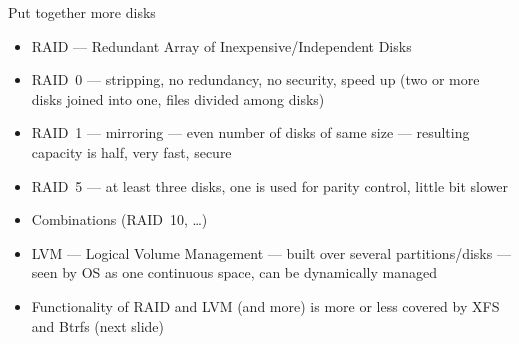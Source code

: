 \documentclass[hyperref={bookmarks=true, unicode=true, colorlinks=true, pdftitle={Linux, command line and MetaCentrum}, plainpages=false, pdfauthor={Vojtech Zeisek}, pdfsubject={Course about use of Linux command line, writing shell scripts and using MetaCentrum of CESNET}, pdfcreator={XeLaTeX, http://www.xelatex.org/}, pdfkeywords={Linux, GNU, BASH, shell, command line, MetaCentrum}, linkcolor=Sienna, anchorcolor=black, citecolor=green, filecolor=magenta, menucolor=Sienna, urlcolor=cyan, pdftex}, compress, ucs, xelatex, xcolor=svgnames, 11pt]{beamer}
\begin{document}
\begin{frame}{Put together more disks}
\begin{itemize}
  \item RAID --- Redundant Array of Inexpensive/Independent Disks
  \item RAID~0 --- stripping, no redundancy, no security, speed up (two or more disks joined into one, files divided among disks)
  \item RAID~1 --- mirroring --- even number of disks of same size --- resulting capacity is half, very fast, secure
  \item RAID~5 --- at least three disks, one is used for parity control, little bit slower
  \item Combinations (RAID~10, \ldots)
  \item LVM --- Logical Volume Management --- built over several partitions/disks --- seen by OS as one continuous space, can be dynamically managed
  \item Functionality of RAID and LVM (and more) is more or less covered by XFS and Btrfs (next slide)
\end{itemize}
\end{frame}
\end{document}

